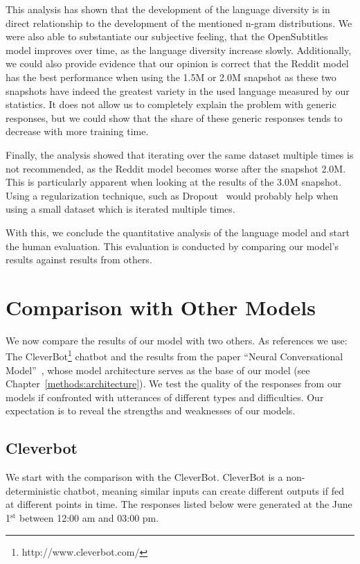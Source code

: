This analysis has shown that the development of the language diversity is in direct relationship to the development of the mentioned n-gram distributions. We were also able to substantiate our subjective feeling, that the OpenSubtitles model improves over time, as the language diversity increase slowly. Additionally, we could also provide evidence that our opinion is correct that the Reddit model has the best performance when using the 1.5M or 2.0M snapshot as these two snapshots have indeed the greatest variety in the used language measured by our statistics. It does not allow us to completely explain the problem with generic responses, but we could show that the share of these generic responses tends to decrease with more training time.

Finally, the analysis showed that iterating over the same dataset multiple times is not recommended, as the Reddit model becomes worse after the snapshot 2.0M. This is particularly apparent when looking at the results of the 3.0M snapshot. Using a regularization technique, such as Dropout~\cite{Nitish:2014} would probably help when using a small dataset which is iterated multiple times.

With this, we conclude the quantitative analysis of the language model and start the human evaluation. This evaluation is conducted by comparing our model's results against results from others.

\section{Comparison with Other Models}
We now compare the results of our model with two others. As references we use: The CleverBot\footnote{http://www.cleverbot.com/} chatbot and the results from the paper ``Neural Conversational Model''~\cite{Vinyals:2015}, whose model architecture serves as the base of our model (see Chapter~\ref{methods:architecture}). We test the quality of the responses from our models if confronted with utterances of different types and difficulties. Our expectation is to reveal the strengths and weaknesses of our models.

\subsection{Cleverbot}
\label{results:comparison:cleverbot}
We start with the comparison with the CleverBot. CleverBot is a non-deterministic chatbot, meaning similar inputs can create different outputs if fed at different points in time. The responses listed below were generated at the June 1$^{\operatorname{st}}$ between 12:00 am and 03:00 pm.

